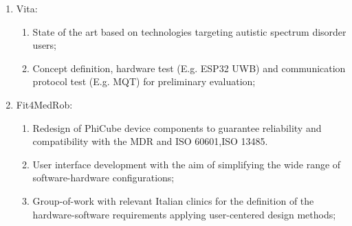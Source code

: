 {\begin{enumerate}
\begin{enumerate}
                \item Integration of a common joystick with serious games for comparison test with the PhiCube console;
                \end{enumerate}
\item Vita:\begin{enumerate}
                \item State of the art based on technologies targeting autistic spectrum disorder users;
                \item Concept definition, hardware test (E.g. ESP32 UWB) and communication protocol test (E.g. MQT) for preliminary evaluation;
                \end{enumerate}
\item Fit4MedRob:\begin{enumerate}
                \item Redesign of PhiCube device components to guarantee reliability and compatibility with the MDR and ISO 60601,ISO 13485.
                \item User interface development with the aim of simplifying the wide range of software-hardware configurations;
                \item Group-of-work with relevant Italian clinics for the definition of the hardware-software requirements applying user-centered design methods;
                \end{enumerate}
\end{enumerate}
}